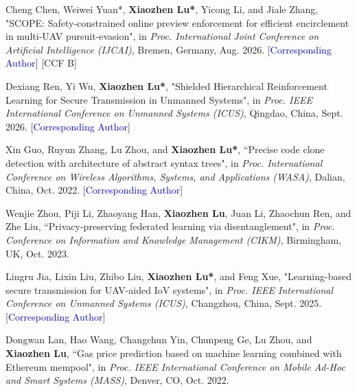 \documentclass{article}
\begin{document}
\begin{justifying}
\begin{myreferences}
	\item Cheng Chen, Weiwei Yuan*, \textbf{Xiaozhen Lu*}, Yicong Li, and Jiale Zhang, "SCOPE: Safety‑constrained online preview enforcement for efficient encirclement in multi‑UAV pursuit‑evasion", in \emph{Proc. International Joint Conference on Artificial Intelligence (IJCAI)}, Bremen, Germany, Aug. 2026. [\textcolor{blue}{Corresponding Author}] [CCF B]
	\item Dexiang Ren, Yi Wu, \textbf{Xiaozhen Lu*}, "Shielded Hierarchical Reinforcement Learning for Secure Transmission in Unmanned Systems", in \emph{Proc. IEEE International Conference on Unmanned Systems (ICUS)}, Qingdao, China, Sept. 2026. [\textcolor{blue}{Corresponding Author}]
	
	\item Xin Guo, Ruyun Zhang, Lu Zhou, and  \textbf{Xiaozhen Lu*}, ``Precise code clone detection with architecture of abstract syntax trees", in \emph{Proc. International Conference on Wireless Algorithms, Systems, and Applications (WASA)}, Dalian, China, Oct. 2022. [\textcolor{blue}{Corresponding Author}]
	\item Wenjie Zhou, Piji Li, Zhaoyang Han, \textbf{Xiaozhen Lu}, Juan Li, Zhaochun Ren, and Zhe Liu, ``Privacy-preserving federated learning via disentanglement", in \emph{Proc. Conference on Information and Knowledge Management (CIKM)}, Birmingham, UK, Oct. 2023.
	\item Lingru Jia, Lixin Liu, Zhibo Liu, \textbf{Xiaozhen Lu*}, and Feng Xue, "Learning-based secure transmission for UAV-aided IoV systems", in \emph{Proc. IEEE International Conference on Unmanned Systems (ICUS)}, Changzhou, China, Sept. 2025. [\textcolor{blue}{Corresponding Author}]
	\item Dongwan Lan, Hao Wang, Changchun Yin, Chunpeng Ge, Lu Zhou, and \textbf{Xiaozhen Lu}, ``Gas price prediction based on machine learning combined with Ethereum mempool", in \emph{Proc. IEEE International Conference on Mobile Ad-Hoc and Smart Systems (MASS)}, Denver, CO, Oct. 2022.
\end{myreferences}
\end{justifying}
\end{document}
